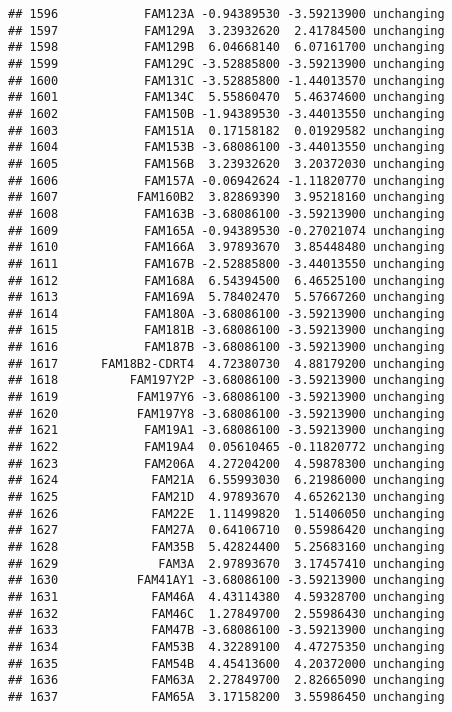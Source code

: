 \documentclass[]{article}
\begin{document}
\begin{verbatim}
## 1596            FAM123A -0.94389530 -3.59213900 unchanging
## 1597            FAM129A  3.23932620  2.41784500 unchanging
## 1598            FAM129B  6.04668140  6.07161700 unchanging
## 1599            FAM129C -3.52885800 -3.59213900 unchanging
## 1600            FAM131C -3.52885800 -1.44013570 unchanging
## 1601            FAM134C  5.55860470  5.46374600 unchanging
## 1602            FAM150B -1.94389530 -3.44013550 unchanging
## 1603            FAM151A  0.17158182  0.01929582 unchanging
## 1604            FAM153B -3.68086100 -3.44013550 unchanging
## 1605            FAM156B  3.23932620  3.20372030 unchanging
## 1606            FAM157A -0.06942624 -1.11820770 unchanging
## 1607           FAM160B2  3.82869390  3.95218160 unchanging
## 1608            FAM163B -3.68086100 -3.59213900 unchanging
## 1609            FAM165A -0.94389530 -0.27021074 unchanging
## 1610            FAM166A  3.97893670  3.85448480 unchanging
## 1611            FAM167B -2.52885800 -3.44013550 unchanging
## 1612            FAM168A  6.54394500  6.46525100 unchanging
## 1613            FAM169A  5.78402470  5.57667260 unchanging
## 1614            FAM180A -3.68086100 -3.59213900 unchanging
## 1615            FAM181B -3.68086100 -3.59213900 unchanging
## 1616            FAM187B -3.68086100 -3.59213900 unchanging
## 1617      FAM18B2-CDRT4  4.72380730  4.88179200 unchanging
## 1618          FAM197Y2P -3.68086100 -3.59213900 unchanging
## 1619           FAM197Y6 -3.68086100 -3.59213900 unchanging
## 1620           FAM197Y8 -3.68086100 -3.59213900 unchanging
## 1621            FAM19A1 -3.68086100 -3.59213900 unchanging
## 1622            FAM19A4  0.05610465 -0.11820772 unchanging
## 1623            FAM206A  4.27204200  4.59878300 unchanging
## 1624             FAM21A  6.55993030  6.21986000 unchanging
## 1625             FAM21D  4.97893670  4.65262130 unchanging
## 1626             FAM22E  1.11499820  1.51406050 unchanging
## 1627             FAM27A  0.64106710  0.55986420 unchanging
## 1628             FAM35B  5.42824400  5.25683160 unchanging
## 1629              FAM3A  2.97893670  3.17457410 unchanging
## 1630           FAM41AY1 -3.68086100 -3.59213900 unchanging
## 1631             FAM46A  4.43114380  4.59328700 unchanging
## 1632             FAM46C  1.27849700  2.55986430 unchanging
## 1633             FAM47B -3.68086100 -3.59213900 unchanging
## 1634             FAM53B  4.32289100  4.47275350 unchanging
## 1635             FAM54B  4.45413600  4.20372000 unchanging
## 1636             FAM63A  2.27849700  2.82665090 unchanging
## 1637             FAM65A  3.17158200  3.55986450 unchanging

\end{verbatim}
\end{document}

